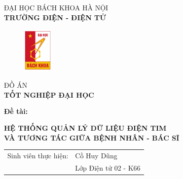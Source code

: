 
\begin{titlepage}
     \begin{center}
     \vspace{-12pt} ĐẠI HỌC BÁCH KHOA HÀ NỘI \\ %
     \textbf{\fontsize{16pt}{0pt}\selectfont TRƯỜNG ĐIỆN - ĐIỆN TỬ}
     \begin{figure}[H] %
         \vspace{0.5cm} %
         \centering
         \includegraphics[width=1.53cm,height=2.26cm]{Images/logohust.png}
     \end{figure}
     \vspace{1.5cm}
     \fontsize{24pt}{0pt}\selectfont ĐỒ ÁN \\ %
     \vspace{12pt}
     \textbf{\fontsize{32pt}{0pt}\selectfont TỐT NGHIỆP ĐẠI HỌC} %
     \vspace{1.5cm}
     \end{center}
     \hspace{8pt}\textbf{\fontsize{14pt}{0pt}\selectfont Đề tài:}
     \begin{center}
   
          \textbf{\fontsize{18pt}{0pt}\selectfont HỆ THỐNG QUẢN LÝ DỮ LIỆU ĐIỆN TIM}\\
           \textbf{\fontsize{18pt}{0pt}\selectfont VÀ TƯƠNG TÁC GIỮA BỆNH NHÂN - BÁC SĨ}
     
     \vspace{1.5cm}
     
     \begin{table}[H]%
          \centering
          \begin{tabular}{l l}
               \fontsize{14pt}{0pt}\selectfont Sinh viên thực hiện:      & \fontsize{14pt}{0pt}\selectfont Cồ Huy Dũng\\
                 &\fontsize{14pt}{0pt}\selectfont Lớp Điện tử 02 - K66  \vspace{6pt} \\
                 

\end{tabular}
\end{table}
\end{center}
\end{titlepage}
